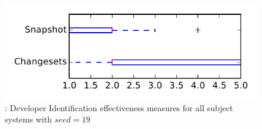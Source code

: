 
\begin{figure}
\centering
\includegraphics[height=0.4\textheight]{figures/dit_seed/rq1_tiny_19}
\caption{\rtwo: Developer Identification effectiveness measures for all subject systems with $seed=19$}
\label{fig:dit_seed:rq1:tiny}
\end{figure}
